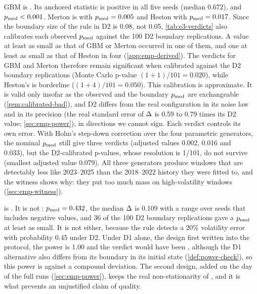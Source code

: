 GBM is \BAD{}. Its anchored statistic is positive in all five seeds (median 0.672), and
$p_{\mathrm{med}}<0.001$. Merton is \BAD{} with $p_{\mathrm{med}}=0.005$ and Heston with $p_{\mathrm{med}}=0.017$. Since the
boundary size of the rule in D2 is 0.08, not 0.05, \cref{tab:e3-verdicts} also calibrates each
observed $p_{\mathrm{med}}$ against the 100 D2 boundary replications. A value at least as small as that of
GBM or Merton occurred in one of them, and one at least as small as that of Heston in four
(\cref{app:emp-derived}). The \BAD{} verdicts for GBM and Merton therefore remain significant
when calibrated against the D2 boundary replications (Monte Carlo p-value $(1+1)/101=0.020$),
while Heston's is borderline ($(1+4)/101=0.050$). This calibration is approximate. It is valid
only insofar as the observed and the boundary $p_{\mathrm{med}}$ are exchangeable (\cref{rem:calibrated-bad}),
and D2 differs from the real configuration in its noise law and in its precision (the real
standard error of $\Delta$ is 0.59 to 0.79 times its D2 value; \cref{sec:emp-power}), in
directions we cannot sign. Each verdict controls its own error. With Holm's step-down correction
over the four parametric generators, the nominal $p_{\mathrm{med}}$ still give three \BAD{} verdicts
(adjusted values 0.002, 0.016 and 0.033), but the D2-calibrated p-values, whose resolution is
1/101, do not survive (smallest adjusted value 0.079). All three generators produce windows that
are detectably less like 2023--2025 than the 2018--2022 history they were fitted to, and the
witness shows why: they put too much mass on high-volatility windows (\cref{sec:emp-witness}).

\GARCHt{} is \INCONCL{}. It is not \BAD{}: $p_{\mathrm{med}}=0.432$, the median $\Delta$ is 0.109 with a
range over seeds that includes negative values, and 36 of the 100 D2 boundary replications gave
a $p_{\mathrm{med}}$ at least as small. It is not \GOOD{} either, because the rule detects a 20\%
volatility error with probability 0.45 under D2. Under D1 alone, the design first written into
the protocol, the power is 1.00 and the verdict would have been \GOOD{}, although the D1
alternative also differs from its boundary in its initial state (\cref{def:power-check}), so this
power is against a compound deviation. The second design, added on the day of the full runs (\cref{sec:emp-power}), keeps the real non-stationarity of
\TRAIN{}, and it is what prevents an unjustified claim of quality.

